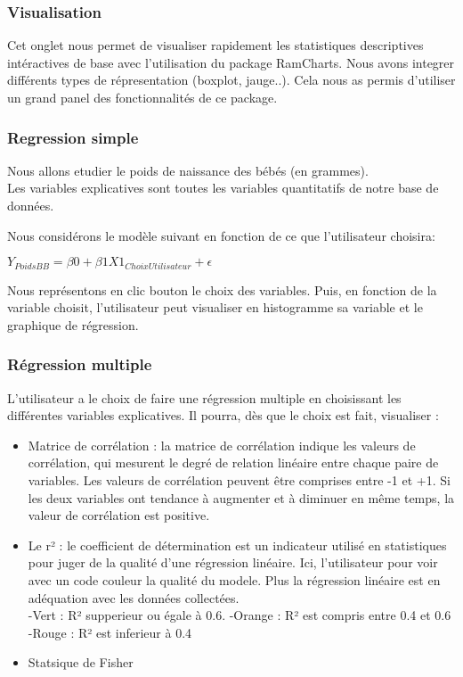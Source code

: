 \documentclass[
]{article}
\begin{document}
\hypertarget{visualisation}{%
\subsubsection{Visualisation}\label{visualisation}}

Cet onglet nous permet de visualiser rapidement les statistiques
descriptives intéractives de base avec l'utilisation du package
RamCharts. Nous avons integrer différents types de répresentation
(boxplot, jauge..). Cela nous as permis d'utiliser un grand panel des
fonctionnalités de ce package.

\hypertarget{regression-simple}{%
\subsubsection{Regression simple}\label{regression-simple}}

Nous allons etudier le poids de naissance des bébés (en grammes).\\
Les variables explicatives sont toutes les variables quantitatifs de
notre base de données.

Nous considérons le modèle suivant en fonction de ce que l'utilisateur
choisira:

\(Y_{PoidsBB} = \beta0 + \beta1 X1_{ChoixUtilisateur} + \epsilon\)

Nous représentons en clic bouton le choix des variables. Puis, en
fonction de la variable choisit, l'utilisateur peut visualiser en
histogramme sa variable et le graphique de régression.

\hypertarget{ruxe9gression-multiple}{%
\subsubsection{Régression multiple}\label{ruxe9gression-multiple}}

L'utilisateur a le choix de faire une régression multiple en choisissant
les différentes variables explicatives. Il pourra, dès que le choix est
fait, visualiser :

\begin{itemize}
\item
  Matrice de corrélation : la matrice de corrélation indique les valeurs
  de corrélation, qui mesurent le degré de relation linéaire entre
  chaque paire de variables. Les valeurs de corrélation peuvent être
  comprises entre -1 et +1. Si les deux variables ont tendance à
  augmenter et à diminuer en même temps, la valeur de corrélation est
  positive.
\item
  Le r² : le coefficient de détermination est un indicateur utilisé en
  statistiques pour juger de la qualité d'une régression linéaire. Ici,
  l'utilisateur pour voir avec un code couleur la qualité du modele.
  Plus la régression linéaire est en adéquation avec les données
  collectées.\\
  -Vert : R² supperieur ou égale à 0.6. -Orange : R² est compris entre
  0.4 et 0.6\\
  -Rouge : R² est inferieur à 0.4
\item
  Statsique de Fisher
\end{itemize}
\end{document}
